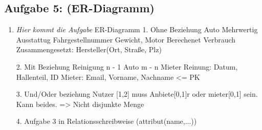 \subsection{Aufgabe 5: (ER-Diagramm)}
\label{sec:Aufgabe5}
\begin{enumerate}[label=\alph*)]
    \item \textit{Hier kommt die Aufgabe}
    ER-Diagramm
1. Ohne Beziehung
Auto Mehrwertig Ausstattug
    Fahrgestellnummer
    Gewicht, Motor
    Berechenet Verbrauch
    Zusammengesetzt: Hersteller(Ort, Straße, Plz)

2. Mit Beziehung
Reinigung n - 1 Auto m - n Mieter
Reinung: Datum, Hallenteil, ID
Mieter: Email, Vorname, Nachname <= PK

3. Und/Oder beziehung
Nutzer [1,2] muss Anbiete[0,1]r oder mieter[0,1] sein. Kann beides.
=> Nicht disjunkte Menge

4. Aufgabe 3 in Relationsschreibweise (attribut(name,...))
\end{enumerate}